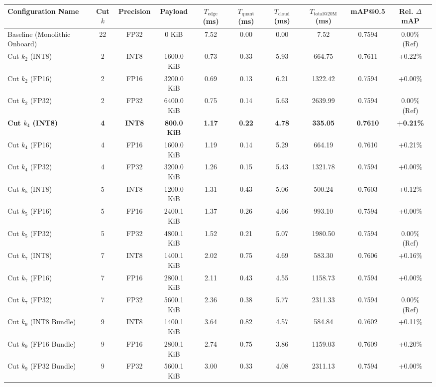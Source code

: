 \begin{tabular}{@{}lccccccccc@{}}
\toprule
\textbf{Configuration Name} & \textbf{Cut $k$} & \textbf{Precision} & \textbf{Payload} & \textbf{$T_{\text{edge}}$ (ms)} & \textbf{$T_{\text{quant}}$ (ms)} & \textbf{$T_{\text{cloud}}$ (ms)} & \textbf{$T_{\text{total@20M}}$ (ms)} & \textbf{mAP@0.5} & \textbf{Rel. $\Delta$mAP} \\ \midrule
Baseline (Monolithic Onboard) & 22 & FP32 & 0 KiB & 7.52 & 0.00 & 0.00 & 7.52 & 0.7594 & 0.00\% (Ref) \\
Cut $k_2$ (INT8) & 2 & INT8 & 1600.0 KiB & 0.73 & 0.33 & 5.93 & 664.75 & 0.7611 & +0.22\% \\
Cut $k_2$ (FP16) & 2 & FP16 & 3200.0 KiB & 0.69 & 0.13 & 6.21 & 1322.42 & 0.7594 & +0.00\% \\
Cut $k_2$ (FP32) & 2 & FP32 & 6400.0 KiB & 0.75 & 0.14 & 5.63 & 2639.99 & 0.7594 & 0.00\% (Ref) \\
\textbf{Cut $k_4$ (INT8)} & \textbf{4} & \textbf{INT8} & \textbf{800.0 KiB} & \textbf{1.17} & \textbf{0.22} & \textbf{4.78} & \textbf{335.05} & \textbf{0.7610} & \textbf{+0.21\%} \\
Cut $k_4$ (FP16) & 4 & FP16 & 1600.0 KiB & 1.19 & 0.14 & 5.29 & 664.19 & 0.7610 & +0.21\% \\
Cut $k_4$ (FP32) & 4 & FP32 & 3200.0 KiB & 1.26 & 0.15 & 5.43 & 1321.78 & 0.7594 & +0.00\% \\
Cut $k_{5}$ (INT8) & 5 & INT8 & 1200.0 KiB & 1.31 & 0.43 & 5.06 & 500.24 & 0.7603 & +0.12\% \\
Cut $k_{5}$ (FP16) & 5 & FP16 & 2400.1 KiB & 1.37 & 0.26 & 4.66 & 993.10 & 0.7594 & +0.00\% \\
Cut $k_{5}$ (FP32) & 5 & FP32 & 4800.1 KiB & 1.52 & 0.21 & 5.07 & 1980.50 & 0.7594 & 0.00\% (Ref) \\
Cut $k_{7}$ (INT8) & 7 & INT8 & 1400.1 KiB & 2.02 & 0.75 & 4.69 & 583.30 & 0.7606 & +0.16\% \\
Cut $k_{7}$ (FP16) & 7 & FP16 & 2800.1 KiB & 2.11 & 0.43 & 4.55 & 1158.73 & 0.7594 & +0.00\% \\
Cut $k_{7}$ (FP32) & 7 & FP32 & 5600.1 KiB & 2.36 & 0.38 & 5.77 & 2311.33 & 0.7594 & 0.00\% (Ref) \\
Cut $k_9$ (INT8 Bundle) & 9 & INT8 & 1400.1 KiB & 3.64 & 0.82 & 4.57 & 584.84 & 0.7602 & +0.11\% \\
Cut $k_9$ (FP16 Bundle) & 9 & FP16 & 2800.1 KiB & 2.74 & 0.75 & 3.86 & 1159.03 & 0.7609 & +0.20\% \\
Cut $k_9$ (FP32 Bundle) & 9 & FP32 & 5600.1 KiB & 3.00 & 0.33 & 4.08 & 2311.13 & 0.7594 & +0.00\% \\

\end{tabular}
